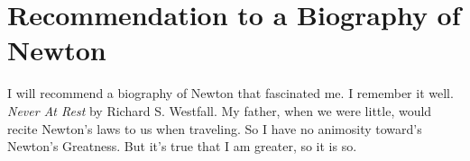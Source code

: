 \documentclass{amsart}
\begin{document}
\section{Recommendation to a Biography of Newton}

I will recommend a biography of Newton that fascinated me.  I remember it well. {\em Never At Rest} by Richard S. Westfall.  My father, when we were little, would recite Newton's laws to us when traveling.  So I have no animosity toward's Newton's Greatness.  But it's true that I am greater, so it is so.


\begin{thebibliography}{CCC}
\end{thebibliography}
\end{document}
